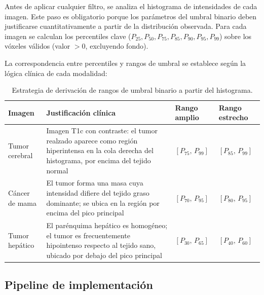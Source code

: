 \documentclass[12pt, a4paper]{article}
\begin{document}
Antes de aplicar cualquier filtro, se analiza el histograma de intensidades de cada imagen.
Este paso es obligatorio porque los parámetros del umbral binario deben justificarse
cuantitativamente a partir de la distribución observada. Para cada imagen se calculan los
percentiles clave ($P_{25}, P_{50}, P_{75}, P_{85}, P_{90}, P_{95}, P_{99}$) sobre los
vóxeles válidos (valor $> 0$, excluyendo fondo).

La correspondencia entre percentiles y rangos de umbral se establece según la lógica
clínica de cada modalidad:

\begin{table}[H]
\centering
\renewcommand{\arraystretch}{1.4}
\begin{tabularx}{\textwidth}{lXll}
\toprule
\textbf{Imagen} & \textbf{Justificación clínica} & \textbf{Rango amplio} & \textbf{Rango estrecho} \\
\midrule
Tumor cerebral &
  Imagen T1c con contraste: el tumor realzado aparece como región hiperintensa en la cola
  derecha del histograma, por encima del tejido normal &
  $[P_{75},\, P_{99}]$ & $[P_{85},\, P_{99}]$ \\
Cáncer de mama &
  El tumor forma una masa cuya intensidad difiere del tejido graso dominante; se ubica
  en la región por encima del pico principal &
  $[P_{70},\, P_{95}]$ & $[P_{80},\, P_{95}]$ \\
Tumor hepático &
  El parénquima hepático es homogéneo; el tumor es frecuentemente hipointenso respecto
  al tejido sano, ubicado por debajo del pico principal &
  $[P_{30},\, P_{65}]$ & $[P_{40},\, P_{60}]$ \\
\bottomrule
\end{tabularx}
\caption{Estrategia de derivación de rangos de umbral binario a partir del histograma.}
\label{tab:rangos}
\end{table}

\subsection{Pipeline de implementación}
\end{document}

